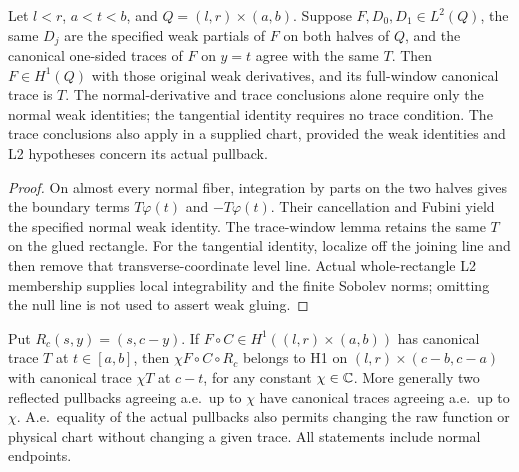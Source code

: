 \begin{lemma}
\label{lem:transverse-trace-weak-gluing}
\leanok
Let $l<r$, $a<t<b$, and $Q=(l,r)\times(a,b)$.
Suppose $F,D_0,D_1\in L^2(Q)$, the same $D_j$ are the specified weak
partials of $F$ on both halves of $Q$, and the canonical one-sided traces
of $F$ on $y=t$ agree with the same $T$.
Then $F\in H^1(Q)$ with those original weak derivatives, and its full-window
canonical trace is $T$.
The normal-derivative and trace conclusions alone require only the normal
weak identities; the tangential identity requires no trace condition.
The trace conclusions also apply in a supplied chart, provided the weak
identities and L2 hypotheses concern its actual pullback.
\end{lemma}

\begin{proof}
\leanok
On almost every normal fiber, integration by parts on the two halves gives
the boundary terms $T\varphi(t)$ and $-T\varphi(t)$.
Their cancellation and Fubini yield the specified normal weak identity.
The trace-window lemma retains the same $T$ on the glued rectangle.
For the tangential identity, localize off the joining line and then remove
that transverse-coordinate level line.
Actual whole-rectangle L2 membership supplies local integrability and the
finite Sobolev norms; omitting the null line is not used to assert weak gluing.
\end{proof}

\begin{lemma}
\label{lem:transverse-trace-reflection}
\leanok
Put $R_c(s,y)=(s,c-y)$.
If $F\circ C\in H^1((l,r)\times(a,b))$ has canonical trace $T$ at
$t\in[a,b]$, then $\chi F\circ C\circ R_c$ belongs to H1 on
$(l,r)\times(c-b,c-a)$ with canonical trace $\chi T$ at $c-t$,
for any constant $\chi\in\mathbb{C}$.
More generally two reflected pullbacks agreeing a.e.\ up to $\chi$
have canonical traces agreeing a.e.\ up to $\chi$.
A.e.\ equality of the actual pullbacks also permits changing the raw
function or physical chart without changing a given trace.
All statements include normal endpoints.
\end{lemma}

